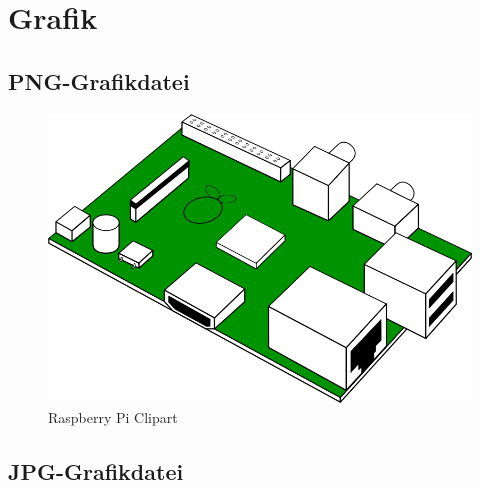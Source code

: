 \chapter{Grafik}

\section{PNG-Grafikdatei}

\begin{figure}[ht]
  \centering
  \includegraphics[scale=0.13]{images/raspberry-pi-pcb-800px.png}
  \caption{Raspberry Pi Clipart}
  \label{fig:Raspberry_Pi_Clipart}
\end{figure}


\section{JPG-Grafikdatei}

